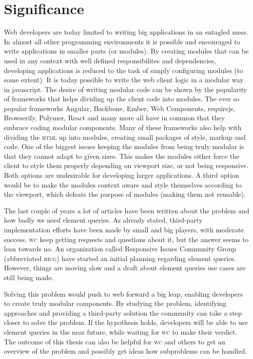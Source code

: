 \documentclass[oneside,a4paper,11pt]{kth-mag}
\begin{document}
\section*{Significance}
Web developers are today limited to writing big applications in an entagled mess. In almost all other programming environments it is possible and encouraged to write applications in smaller parts (or modules). By creating modules that can be used in any context with well defined responsibilites and dependencies, developing applications is reduced to the task of simply configuring modules (to some extent). It is today possible to write the web client logic in a modular way in javascript. The desire of writing modular code can be shown by the popularity of frameworks that helps dividing up the client code into modules. The ever so popular frameworks Angular, Backbone, Ember, Web Components, requirejs, Browserify, Polymer, React and many more all have in common that they embrace coding modular components. Many of these frameworks also help with dividing the \textsc{html} up into modules, creating small packages of style, markup and code. One of the biggest issues keeping the modules from being truly modular is that they cannot adapt to given sizes. This makes the modules either force the client to style them properly depending on viewport size, or not being responsive. Both options are undesirable for developing larger applications. A third option would be to make the modules context aware and style themselves according to the viewport, which defeats the purpose of modules (making them not reusable).

The last couple of years a lot of articles have been written about the problem and how badly we need element queries. As already stated, third-party implementation efforts have been made by small and big players, with moderate success. \textsc{w}\textsc{c} keep getting requests and questions about it, but the answer seems to lean towards no. An organization called Responsive Issues Community Group (abbreviated \textsc{ricg}) have started an initial planning regarding element queries. However, things are moving slow and a draft about element queries use cases are still being made.

Solving this problem would push to web forward a big leap, enabling developers to create truly modular components. By studying the problem, identifying approaches and providing a third-party solution the community can take a step closer to solve the problem. If the hypothesis holds, developers will be able to use element queries in the near future, while waiting for \textsc{w}\textsc{c} to make their verdict. The outcome of this thesis can also be helpful for \textsc{w}\textsc{c} and others to get an overview of the problem and possibly get ideas how subproblems can be handled.
\end{document}
